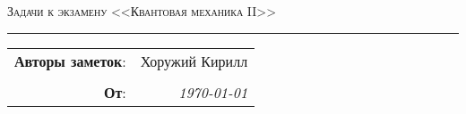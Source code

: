 
\begin{center}
    \LARGE \textsc{Задачи к экзамену <<Квантовая механика II>>}
\end{center}

\hrule

\phantom{42}

\begin{flushright}
    \begin{tabular}{rr}
        \textbf{Авторы заметок}: 
        & Хоружий Кирилл \\
        & \\
        \textbf{От}: &
        \textit{\today}\\
    \end{tabular}
\end{flushright}

\thispagestyle{empty}
\tableofcontents
\newpage
